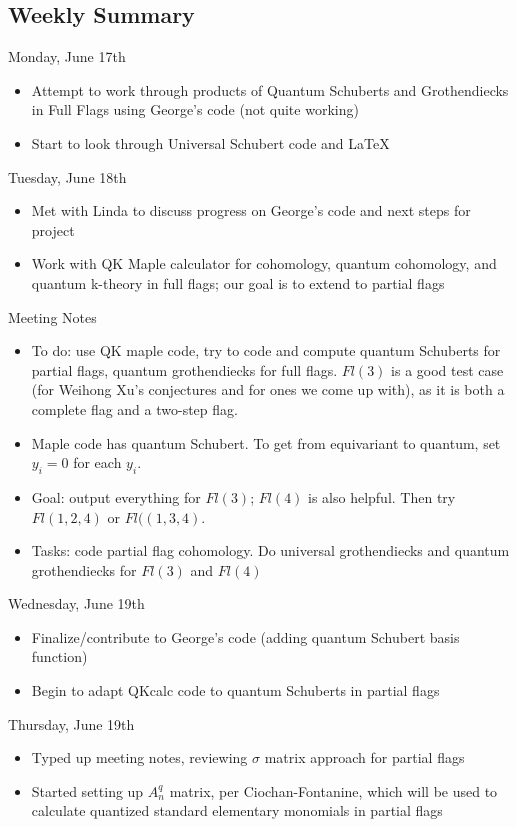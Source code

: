 \subsection{Weekly Summary}

Monday, June 17th
\begin{itemize}
    \item Attempt to work through products of Quantum Schuberts and Grothendiecks in Full Flags using George's code (not quite working)
    \item Start to look through Universal Schubert code and LaTeX
\end{itemize}

Tuesday, June 18th
\begin{itemize}
    \item Met with Linda to discuss progress on George's code and next steps for project
    \item Work with QK Maple calculator for cohomology, quantum cohomology, and quantum k-theory in full flags; our goal is to extend to partial flags
\end{itemize}

Meeting Notes
\begin{itemize}
    \item To do: use QK maple code, try to code and compute quantum Schuberts for partial flags, quantum grothendiecks for full flags. $Fl(3)$ is a good test case (for Weihong Xu's conjectures and for ones we come up with), as it is both a complete flag and a two-step flag. 
    \item Maple code has quantum Schubert. To get from equivariant to quantum, set $y_i = 0$ for each $y_i$.
    \item Goal: output everything for $Fl(3)$; $Fl(4)$ is also helpful. Then try $Fl(1,2,4)$ or $Fl((1,3,4)$.
    \item Tasks: code partial flag cohomology. Do universal grothendiecks and quantum grothendiecks for $Fl(3)$ and $Fl(4)$
\end{itemize}

Wednesday, June 19th
\begin{itemize}
    \item Finalize/contribute to George's code (adding quantum Schubert basis function)
    \item Begin to adapt QKcalc code to quantum Schuberts in partial flags
\end{itemize}

Thursday, June 19th
\begin{itemize}
    \item Typed up meeting notes, reviewing $\sigma$ matrix approach for partial flags 
    \item Started setting up $A_n^q$ matrix, per Ciochan-Fontanine, which will be used to calculate quantized standard elementary monomials in partial flags
\end{itemize}

